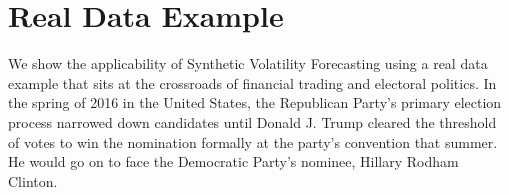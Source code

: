 \documentclass[11pt]{article}
\theoremstyle{definition}
\begin{document}

\clearpage 

\section{Real Data Example}

We show the applicability of Synthetic Volatility Forecasting using a real data example that sits at the crossroads of financial trading and electoral politics.  In the spring of 2016 in the United States, the Republican Party's primary election process narrowed down candidates until Donald J. Trump cleared the threshold of votes to win the nomination formally at the party's convention that summer.  He would go on to face the Democratic Party's nominee, Hillary Rodham Clinton.   
\end{document}

